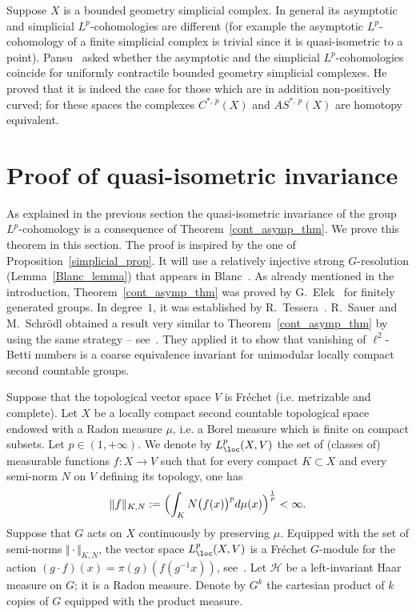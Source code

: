 \begin{rema}
Suppose $X$ is a bounded geometry simplicial complex. In general its asymptotic and simplicial
$L^p$-cohomologies are different (for example the asymptotic $L^p$-cohomology of a finite simplicial complex is trivial since it is quasi-isometric to a point). Pansu~\cite{Pa95} asked whether the asymptotic and the simplicial $L^p$-cohomologies coincide for uniformly contractile bounded geometry simplicial complexes. He proved that it is indeed the case for those which are in addition non-positively curved; for these spaces the complexes $C^{*,\,p}(X)$ and $AS^{*,\,p}(X)$ are homotopy equivalent.
\end{rema}


\section{Proof of quasi-isometric invariance}\label{4}

As explained in the previous section the quasi-isometric invariance of the group $L^p$-cohomology is a consequence of Theorem~\ref{cont_asymp_thm}. We prove this theorem in this section. The proof is inspired by the one of Proposition~\ref{simplicial_prop}. It will use a relatively injective strong $G$-resolution (Lemma~\ref{Blanc_lemma}) that appears in Blanc~\cite{Bl}. As already mentioned in the introduction, Theorem~\ref{cont_asymp_thm} was proved by G.~Elek~\cite{Elek} for finitely generated groups. In degree~$1$, it was established by R.~Tessera~\cite{T}. R.~Sauer and M.~Schr\"odl obtained a result very similar to Theorem~\ref{cont_asymp_thm} by using the same strategy -- see~\cite[Theorem~10]{SaSc}. They applied it to show that vanishing of $\ell^2$-Betti numbers is a coarse equivalence invariant for unimodular locally compact second countable groups.


Suppose that the topological vector space $V$ is Fréchet (i.e. metrizable and complete). Let $X$ be a locally compact second countable topological space endowed with a Radon measure $\mu$, i.e. a Borel measure which is finite on compact subsets. Let $p \in (1, +\infty)$. We denote by $L_{\loc}^p(X,V)$ the set of (classes of) measurable functions $f: X \to V$ such that for every compact $K \subset X$ and every semi-norm $N$ on $V$ defining its topology, one has
\[
\Vert f \Vert _{K,N}:= \Bigl(\int _K N\bigl(f(x)\bigr) ^p d\mu (x) \Bigr)^{\frac{1}{p}} < \infty.
\]
Suppose that $G$ acts on $X$ continuously by preserving $\mu$. Equipped with the set of semi-norms $\Vert \cdot \Vert_{K,N}$, the vector space $L_{\loc}^p(X,V)$ is a Fréchet $G$-module for the action $(g \cdot f) (x) = \pi (g) (f(g^{-1} x))$, see~\cite{Bl}. Let $\mathcal H$ be a left-invariant Haar measure on $G$; it is a Radon measure. Denote by $G^k$ the cartesian product of $k$ copies of $G$ equipped with the product measure.

